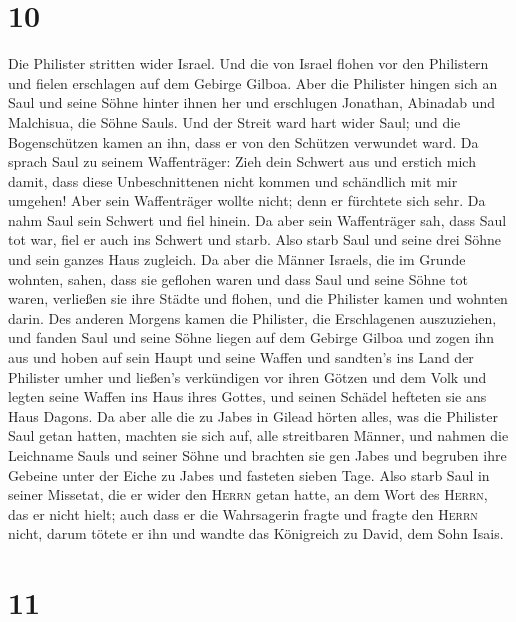\hypertarget{section-9}{%
\section{10}\label{section-9}}

 Die Philister stritten wider Israel. Und die von Israel
flohen vor den Philistern und fielen erschlagen auf dem Gebirge Gilboa.
 Aber die Philister hingen sich an Saul und seine Söhne
hinter ihnen her und erschlugen Jonathan, Abinadab und Malchisua, die
Söhne Sauls.  Und der Streit ward hart wider Saul; und die
Bogenschützen kamen an ihn, dass er von den Schützen verwundet ward.
 Da sprach Saul zu seinem Waffenträger: Zieh dein Schwert
aus und erstich mich damit, dass diese Unbeschnittenen nicht kommen und
schändlich mit mir umgehen! Aber sein Waffenträger wollte nicht; denn er
fürchtete sich sehr. Da nahm Saul sein Schwert und fiel hinein.
 Da aber sein Waffenträger sah, dass Saul tot war, fiel er
auch ins Schwert und starb.  Also starb Saul und seine
drei Söhne und sein ganzes Haus zugleich.  Da aber die
Männer Israels, die im Grunde wohnten, sahen, dass sie geflohen waren
und dass Saul und seine Söhne tot waren, verließen sie ihre Städte und
flohen, und die Philister kamen und wohnten darin.  Des
anderen Morgens kamen die Philister, die Erschlagenen auszuziehen, und
fanden Saul und seine Söhne liegen auf dem Gebirge Gilboa 
und zogen ihn aus und hoben auf sein Haupt und seine Waffen und
sandten's ins Land der Philister umher und ließen's verkündigen vor
ihren Götzen und dem Volk  und legten seine Waffen ins
Haus ihres Gottes, und seinen Schädel hefteten sie ans Haus Dagons.
 Da aber alle die zu Jabes in Gilead hörten alles, was
die Philister Saul getan hatten,  machten sie sich auf,
alle streitbaren Männer, und nahmen die Leichname Sauls und seiner Söhne
und brachten sie gen Jabes und begruben ihre Gebeine unter der Eiche zu
Jabes und fasteten sieben Tage.  Also starb Saul in
seiner Missetat, die er wider den \textsc{Herrn} getan hatte, an dem
Wort des \textsc{Herrn}, das er nicht hielt; auch dass er die
Wahrsagerin fragte  und fragte den \textsc{Herrn} nicht,
darum tötete er ihn und wandte das Königreich zu David, dem Sohn Isais.

\hypertarget{section-10}{%
\section{11}\label{section-10}}

